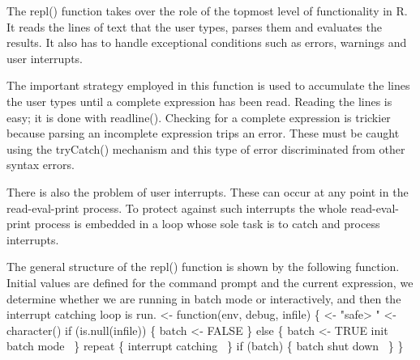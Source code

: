 \documentclass[a4paper]{article}%
\begin{document}
The {\Tt{}repl()\nwendquote} function takes over the role of the topmost level of
functionality in R.  It reads the lines of text that the user types,
parses them and evaluates the results.  It also has to handle
exceptional conditions such as errors, warnings and user interrupts.

The important strategy employed in this function
is used to accumulate the lines the user types
until a complete expression has been read.  Reading the lines is easy;
it is done with {\Tt{}readline()\nwendquote}.  Checking for a complete expression
is trickier because parsing an incomplete expression trips an error.
These must be caught using the {\Tt{}tryCatch()\nwendquote} mechanism and this
type of error discriminated from other syntax errors.

There is also the problem of user interrupts.  These can occur at any
point in the read-eval-print process. To protect against such
interrupts the whole read-eval-print process is embedded in a loop
whose sole task is to catch and process interrupts.

The general structure of the {\Tt{}repl()\nwendquote} function is shown by the
following function.  Initial values are defined for the
command prompt and the current expression, we determine whether
we are running in batch mode or interactively, and then the interrupt
catching loop is run.
\nwenddocs{}\endmoddef\nwstartdeflinemarkup{}\nwenddeflinemarkup
{} <- function(env, debug, infile) \{
     <- "safe> "
     <- character()
    if (is.null(infile)) \{
        batch <- FALSE
    \} else \{
        batch <- TRUE
        \LA{}init batch mode~{\nwtagstyle{}}\RA{}
    \}
    repeat \{
        \LA{}interrupt catching~{\nwtagstyle{}}\RA{}
    \}
    if (batch) \{
        \LA{}batch shut down~{\nwtagstyle{}}\RA{}
    \}
\}
\end{document}
